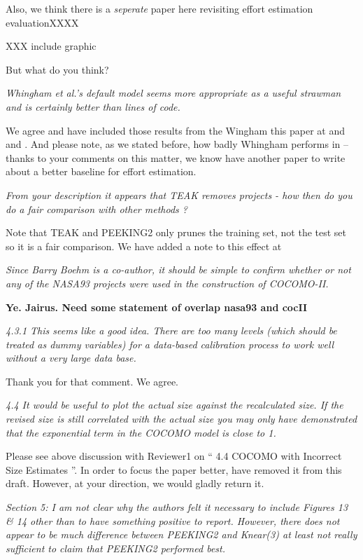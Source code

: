\documentclass[smallcondesed]{svjour3}
\begin{document}
Also, we think there is a {\em seperate} paper here revisiting effort estimation evaluationXXXX

XXX include graphic

But what do you think?

{\em Whingham et al.'s default model seems more
  appropriate as a useful strawman and is certainly
  better than lines of code.}

 We agree and 
have included those results from the Wingham this paper at
 and  and . And please note, as we stated
before, how badly
Whingham performs in -- thanks to your comments on this matter, we know have
another paper to write about a better baseline for effort estimation.


{\em From your description it appears that TEAK
  removes projects - how then do you do a fair
  comparison with other methods ? }

Note that TEAK and PEEKING2 only prunes the training set, not the test set so it is a fair comparison.
We have added a note to this effect at 

{\em Since Barry Boehm is a co-author, it should be simple to confirm whether or not any of the NASA93 projects were used in the construction of COCOMO-II.}

{\bf Ye. Jairus. Need some statement of overlap nasa93 and cocII}


{\em  4.3.1 This seems like a good idea. There are too many levels (which should be treated as dummy variables) for a data-based calibration process to work well without a very large data base.}

Thank you for that comment. We agree.

{\em 4.4 It would be useful to plot the actual size against the recalculated size. If the revised size is still correlated with the actual size you may only have demonstrated that the exponential term in the COCOMO model is close to 1.}

Please see above discussion with Reviewer1 on `` 4.4 COCOMO with Incorrect Size Estimates ''.
In order to focus the paper better,  have removed it from this draft. However, at your direction, we would gladly return it.


{\em Section 5: I am not clear why the authors felt it necessary to include Figures 13 \& 14 other than to have something positive to report. However, there does not appear to be much difference between PEEKING2 and Knear(3) at least not really sufficient to claim that PEEKING2 performed best.}
\end{document}
